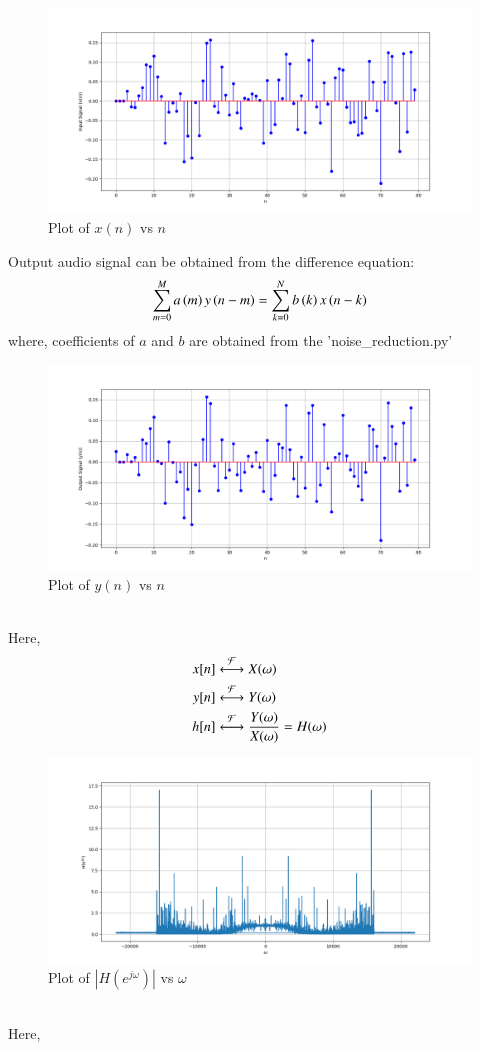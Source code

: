 \documentclass[journal,12pt,twocolumn]{IEEEtran}
\theoremstyle{remark}
\begin{document}
\begin{figure}[htbp] 
\centering
\includegraphics[width=\columnwidth]{figs/x(n).png}
\caption{Plot of $x(n)$  vs $n$ }
\end{figure}
Output audio signal can be obtained from the difference equation: 
\begin{align}
     \sum _{m=0}^{M}a\left(m\right)y\left(n-m\right)=\sum _{k=0}^{N}b\left(k\right)x\left(n-k\right)
\end{align}
where, 
coefficients of $a$ and $b$ are obtained from the 'noise\_reduction.py'
\begin{figure}[htbp] 
\centering
\includegraphics[width=1.1\columnwidth]{figs/y(n).png}
\caption{Plot of $y(n)$ vs $n$}
\end{figure}\\
Here,
\begin{align}
x[n] & \system{\mathcal{F}}X(\omega) \\
y[n] & \system{\mathcal{F}}Y(\omega) \\
h[n] & \system{\mathcal{F}}\frac{Y(\omega)}{X(\omega)} = H(\omega)
\end{align}
\begin{figure}[htbp] 
\centering
\includegraphics[width=\columnwidth]{figs/H(z).png}
\caption{Plot of $|H(e^{j\omega})|$ vs $\omega$}
\end{figure}\\
Here,
\end{document}
